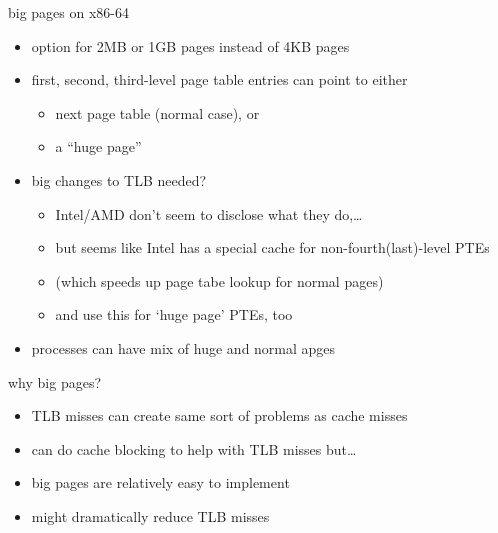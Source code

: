 \begin{frame}{big pages on x86-64}
\begin{itemize}
\item option for 2MB or 1GB pages instead of 4KB pages
\item first, second, third-level page table entries can point to either
    \begin{itemize}
    \item next page table (normal case), or
    \item a ``huge page'' 
    \end{itemize}
\item big changes to TLB needed?
    \begin{itemize}
    \item Intel/AMD don't seem to disclose what they do,\ldots
    \item but seems like Intel has a special cache for non-fourth(last)-level PTEs
    \item (which speeds up page tabe lookup for normal pages)
    \item and use this for `huge page' PTEs, too
    \end{itemize}
    \vspace{1cm}
\item processes can have mix of huge and normal apges
\end{itemize}
\end{frame}

\begin{frame}{why big pages?}
\begin{itemize}
\item TLB misses can create same sort of problems as cache misses
\item can do cache blocking to help with TLB misses but\ldots
    \vspace{.5cm}
\item big pages are relatively easy to implement
\item might dramatically reduce TLB misses
\end{itemize}
\end{frame}
